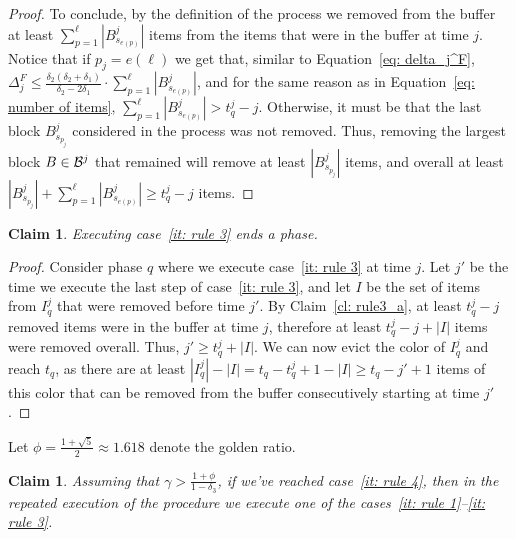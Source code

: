 \documentclass[11pt]{article}
\newtheorem{claim}[theorem]{Claim}
\begin{document}
\begin{proof}
To conclude, by the definition of the process we removed from
the buffer at least $\sum_{p=1}^{\ell}  |B^j_{s_{e(p)}}|$
items from the items that were in the buffer at time $j$.
Notice that if $p_j =e(\ell)$ we get that, similar to Equation~\eqref{eq: delta_j^F},
$\Delta_j^F \le
\frac{\delta_2(\delta_2+\delta_1)}{\delta_2- 2\delta_1}
\cdot \sum_{p=1}^{\ell}  |B^j_{s_{e(p)}}|$,
and for the same reason as in Equation~\eqref{eq: number of items},
$\sum_{p=1}^{\ell} |B^j_{s_{e(p)}}| > t_q^j-j$.
Otherwise, it must be that the last block $B_{s_{p_j}}^j$ considered in the process
was not removed. Thus, removing the largest block $B\in {\cal B}^j$ that
remained will remove at least $|B^j_{s_{p_j}}|$ items, and overall
at least $|B^j_{s_{p_j}}| +\sum_{p=1}^{\ell}  |B^j_{s_{e(p)}}|\ge  t_q^j-j$
items.
\end{proof}

\begin{claim}\label{cl: rule3_b}
Executing case~\ref{it: rule 3} ends a phase.
\end{claim}

\begin{proof}
Consider phase $q$ where we execute case~\ref{it: rule 3}
at time $j$.
Let $j'$ be the time we execute the last step of
case~\ref{it: rule 3},
and let $I$ be the set of items from $I^j_q$ that were removed
before time $j'$. By Claim~\ref{cl: rule3_a}, at least $t_q^{j}-j$
removed items were in the buffer at time $j$,
therefore at least $t_q^{j}-j+|I|$ items were removed overall.
Thus, $j' \ge t_q^j + |I|$. We can now evict the color of $I^j_q$
and reach $t_q$, as there are at least
$|I^j_q|-|I|= t_q - t_q^{j} +1 - |I| \ge t_q - j' + 1$ items
of this color that can be removed from the buffer consecutively
starting at time $j'$.
\end{proof}

Let $\phi = \frac{1 + \sqrt{5}}{2}\approx 1.618$ denote
the golden ratio.
\begin{claim}\label{cl: rule 4}
Assuming that $\gamma > \frac{1+\phi}{1 - \delta_3}$,
if we've reached case~\ref{it: rule 4}, then in the repeated
execution of the procedure we execute one of the
cases~\ref{it: rule 1}--\ref{it: rule 3}.
\end{claim}
\end{document}
